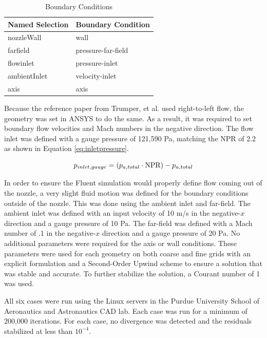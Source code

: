 \documentclass[12pt]{article} %
\begin{document}
\begin{table}[ht]
    \caption{Boundary Conditions}
    \centering
    \begin{tabular}{l|l}
        Named Selection&Boundary Condition\\
        \hline
        nozzleWall&wall\\
        farfield&pressure-far-field\\
        flowinlet&pressure-inlet\\
        ambientInlet&velocity-inlet\\
        axis&axis\\
        \hline
    \end{tabular}
    \label{tab:boundary}
\end{table}

Because the reference paper from Trumper, et al. used right-to-left flow, the geometry was set in ANSYS to do the same. As a result, it was required to set boundary flow velocities and Mach numbers in the negative direction. The flow inlet was defined with a gauge pressure of 121,590 Pa, matching the NPR of 2.2 as shown in Equation \ref{eq:inletpressure}.

\begin{equation}\label{eq:inletpressure}
    p_{inlet,gauge}=\left(p_{a,total}\cdot \textnormal{NPR}\right)-p_{a,total}
\end{equation}

In order to ensure the Fluent simulation would properly define flow coming out of the nozzle, a very slight fluid motion was defined for the boundary conditions outside of the nozzle. This was done using the ambient inlet and far-field. The ambient inlet was defined with an input velocity of 10 m/s in the negative-$x$ direction and a gauge pressure of 10 Pa. The far-field was defined with a Mach number of .1 in the negative-$x$ direction and a gauge pressure of 20 Pa. No additional parameters were required for the axis or wall conditions. These parameters were used for each geometry on both coarse and fine grids with an explicit formulation and a Second-Order Upwind scheme to ensure a solution that was stable and accurate. To further stabilize the solution, a Courant number of 1 was used.\par

All six cases were run using the Linux servers in the Purdue University School of Aeronautics and Astronautics CAD lab. Each case was run for a minimum of 200,000 iterations. For each case, no divergence was detected and the residuals stabilized at less than $10^{-4}$.
\end{document}

